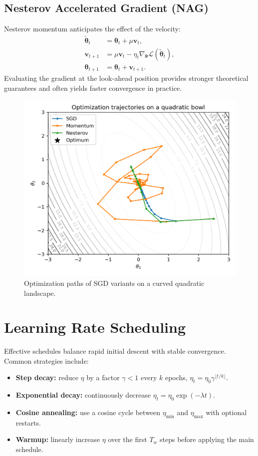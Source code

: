 ﻿\documentclass[12pt]{article}
\begin{document}
\subsection{Nesterov Accelerated Gradient (NAG)}
Nesterov momentum anticipates the effect of the velocity:
\begin{align}
  \tilde{\boldsymbol{\theta}}_t &= \boldsymbol{\theta}_t + \mu \mathbf{v}_t, \\
  \mathbf{v}_{t+1} &= \mu \mathbf{v}_t - \eta_t \nabla_{\boldsymbol{\theta}} \mathcal{L}(\tilde{\boldsymbol{\theta}}_t), \\
  \boldsymbol{\theta}_{t+1} &= \boldsymbol{\theta}_t + \mathbf{v}_{t+1}.
\end{align}
Evaluating the gradient at the look-ahead position provides stronger theoretical guarantees and often yields faster convergence in practice.

\begin{figure}[H]
  \centering
  \includegraphics[width=0.8\linewidth]{optimization_trajectories.png}
  \caption{Optimization paths of SGD variants on a curved quadratic landscape.}
  \label{fig:optimization_trajectories}
\end{figure}
\FloatBarrier

\section{Learning Rate Scheduling}
Effective schedules balance rapid initial descent with stable convergence. Common strategies include:

\begin{itemize}
  \item \textbf{Step decay:} reduce $\eta$ by a factor $\gamma < 1$ every $k$ epochs, \(\eta_t = \eta_0 \gamma^{\lfloor t/k \rfloor}\).
  \item \textbf{Exponential decay:} continuously decrease $\eta_t = \eta_0 \exp(-\lambda t)$.
  \item \textbf{Cosine annealing:} use a cosine cycle between $\eta_{\min}$ and $\eta_{\max}$ with optional restarts.
  \item \textbf{Warmup:} linearly increase $\eta$ over the first $T_w$ steps before applying the main schedule.
\end{itemize}
\end{document}
